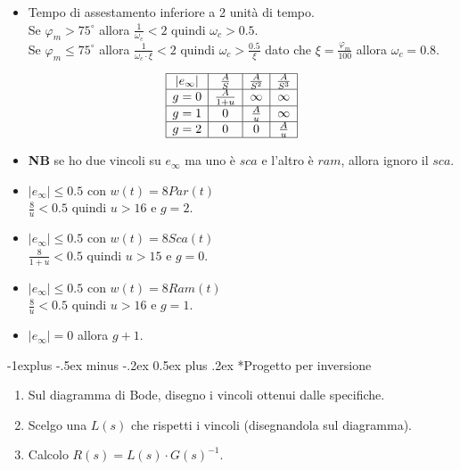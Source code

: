 \documentclass[10pt,landscape, a4paper]{scrartcl} %
\makeatletter
\renewcommand{\subsection}{\@startsection{subsection}{2}{0mm}%
                                {-1explus -.5ex minus -.2ex}%
                                {0.5ex plus .2ex}%
                                {\normalfont\normalsize\bfseries}}
\makeatother
\begin{document}
\begin{multicols*}{3}
\begin{itemize}
	\item Tempo di assestamento inferiore a 2 unità di tempo.\\
		Se $\varphi_m > 75^{\circ}$ allora $\frac{1}{\omega_c} < 2$ quindi $\omega_c > 0.5$.\\
		Se $\varphi_m \leq 75^{\circ}$ allora $\frac{1}{\omega_c \cdot \xi} < 2$ quindi $\omega_c > \frac{0.5}{\xi}$ dato che $\xi = \frac{\varphi_m}{100}$ allora $\omega_c = 0.8$.
\end{itemize}
\begin{equation}
	\begin{array}{|c|c|c|c|}
	\hline
	|e_\infty|  & \frac{A}{S}    & \frac{A}{S^2}  & \frac{A}{S^3} \\ \hline
	g=0  & \frac{A}{1+u}  & \infty         & \infty       \\ \hline
	g=1  & 0              & \frac{A}{u}    & \infty       \\ \hline
	g=2  & 0              & 0              & \frac{A}{u}  \\ \hline
	\end{array}
\end{equation}
\begin{itemize}
	\item \textbf{NB} se ho due vincoli su $e_\infty$ ma uno è $sca$ e l'altro è $ram$, allora ignoro il $sca$.
	\item $|e_\infty| \leq 0.5$ con $w(t) = 8 Par(t)$\\
			$\frac{8}{u} < 0.5$ quindi $u > 16$ e $g=2$.
	\item $|e_\infty| \leq 0.5$ con $w(t) = 8 Sca(t)$\\
			$\frac{8}{1+u} < 0.5$ quindi $u > 15$ e $g=0$.
	\item $|e_\infty| \leq 0.5$ con $w(t) = 8 Ram(t)$\\
		$\frac{8}{u} < 0.5$ quindi $u > 16$ e $g=1$.
	\item $|e_\infty| = 0$ allora $g + 1$.
\end{itemize}

\subsection*{Progetto per inversione}
\begin{enumerate}
	\item Sul diagramma di Bode, disegno i vincoli ottenui dalle specifiche.
	\item Scelgo una $L(s)$ che rispetti i vincoli (disegnandola sul diagramma).
	\item Calcolo $R(s) = L(s) \cdot G(s) ^{-1}$.
\end{enumerate}

\end{multicols*}
\end{document}
